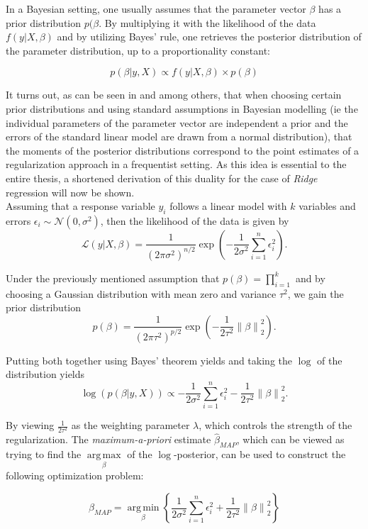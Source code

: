 \documentclass[12pt,a4paper]{article}
\newcommand{\norm}[1]{\left\lVert#1\right\rVert}
\DeclareMathOperator*{\argmax}{arg\,max}
\DeclareMathOperator*{\argmin}{arg\,min}
\begin{document}
In a Bayesian setting, one usually assumes that the parameter vector $\mathbb{\beta}$ has a prior distribution $p(\mathbb{\beta}$. By multiplying it with the likelihood of the data $f(y|X,\beta)$ and by utilizing Bayes' rule, one retrieves the posterior distribution of the parameter distribution, up to a proportionality constant:

$$p(\beta|y,X) \propto f(y|X, \beta) \times p(\beta)$$  

It turns out, as can be seen in \textcite[248--250]{ESL2009} and \textcite{VanWieringen2015} among others, that when choosing certain prior distributions and using standard assumptions in Bayesian modelling (ie the individual parameters of the parameter vector are independent a prior and the errors of the standard linear model are drawn from a normal distribution), that the moments of the posterior distributions correspond to the point estimates of a regularization approach in a frequentist setting. As this idea is essential to the entire thesis, a shortened derivation of this duality for the case of \textit{Ridge} regression will now be shown.\\

Assuming that a response variable $y_i$ follows a linear model with $k$ variables and errors $\epsilon_i \sim \mathcal{N}(0, \sigma^2)$, then the likelihood of the data is given by
$$\mathcal{L}(y|X,\beta)=\frac{1}{(2\pi\sigma^2)^{n/2}}\exp\left(-\frac{1}{2\sigma^2}\sum_{i=1}^n\epsilon_i^2\right).$$

Under the previously mentioned assumption that $p(\beta) = \prod_{i=1}^k$ and by choosing a Gaussian distribution with mean zero and variance $\tau^2$, we gain the prior distribution
$$p(\beta) = \frac{1}{(2\pi\tau^2)^{p/2}}\exp\left(-\frac{1}{2\tau^2}\norm{\beta}_2^2\right).$$

Putting both together using Bayes' theorem yields and taking the $\log$ of the distribution yields
$$\log(p(\beta|y,X)) \propto -\frac{1}{2\sigma^2}\sum_{i=1}^n \epsilon_i^2  - \frac{1}{2\tau^2}\norm{\beta}_2^2.$$

By viewing $\frac{1}{2\tau^2}$ as the weighting parameter $\lambda$, which controls the strength of the regularization. The \textit{maximum-a-priori} estimate $\hat{\beta}_{MAP}$, which can be viewed as trying to find the $\underset{\beta}{\argmax}$ of the $\log$-posterior, can be used to construct the following optimization problem:

$$\hat{\beta}_{MAP} = \underset{\beta}{\argmin}\left\{\frac{1}{2\sigma^2}\sum_{i=1}^n \epsilon_i^2  + \frac{1}{2\tau^2}\norm{\beta}_2^2\right\}$$
\end{document}
